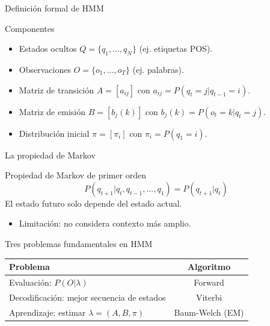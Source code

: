 \documentclass[aspectratio=169, 10pt, xcolor=table]{beamer}
\begin{document}
\begin{frame}{Definición formal de HMM}
    \begin{block}{Componentes}
        \begin{itemize}
            \item Estados ocultos $Q = \{q_1,\dots,q_N\}$ (ej. etiquetas POS).
            \item Observaciones $O = \{o_1,\dots,o_T\}$ (ej. palabras).
            \item Matriz de transición $A = [a_{ij}]$ con $a_{ij} = P(q_t=j|q_{t-1}=i)$.
            \item Matriz de emisión $B = [b_j(k)]$ con $b_j(k) = P(o_t=k|q_t=j)$.
            \item Distribución inicial $\pi = [\pi_i]$ con $\pi_i = P(q_1=i)$.
        \end{itemize}
    \end{block}
\end{frame}

\begin{frame}{La propiedad de Markov}
    \begin{block}{Propiedad de Markov de primer orden}
        \[
        P(q_{t+1}|q_t, q_{t-1}, \dots, q_1) = P(q_{t+1}|q_t)
        \]
        El estado futuro solo depende del estado actual.
    \end{block}
    \begin{itemize}
        \item Limitación: no considera contexto más amplio.
    \end{itemize}
\end{frame}

\begin{frame}{Tres problemas fundamentales en HMM}
    \begin{table}
        \centering
        \begin{tabular}{l|c}
            \toprule
            \textbf{Problema} & \textbf{Algoritmo} \\
            \midrule
            Evaluación: $P(O|\lambda)$ & Forward \\
            Decodificación: mejor secuencia de estados & Viterbi \\
            Aprendizaje: estimar $\lambda = (A,B,\pi)$ & Baum-Welch (EM) \\
            \bottomrule
        \end{tabular}
    \end{table}
\end{frame}
\end{document}
